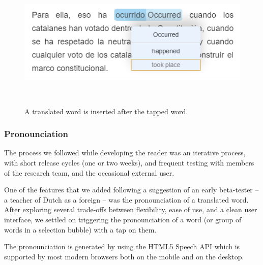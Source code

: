 \begin{figure}[h!]
\centering
  \includegraphics[width=0.8\columnwidth]{figures/translation_alter_menu}
  \caption{A translated word is inserted after the tapped word.}~\label{fig:registrations}
\end{figure}

\subsubsection{Pronounciation}

The process we followed while developing the reader was an iterative process, with short release cycles (one or two weeks), and frequent testing with members of the research team, and the occasional external user. 

One of the features that we added following a suggestion of an early beta-tester -- a teacher of Dutch as a foreign -- was the pronounciation of a translated word. After exploring several trade-offs between flexibility, ease of use, and a clean user interface, we settled on triggering the pronounciation of a word (or group of words in a selection bubble) with a tap on them. 

The pronounciation is generated by using the HTML5 Speech API which is supported by most modern browsers both on the mobile and on the desktop. 

